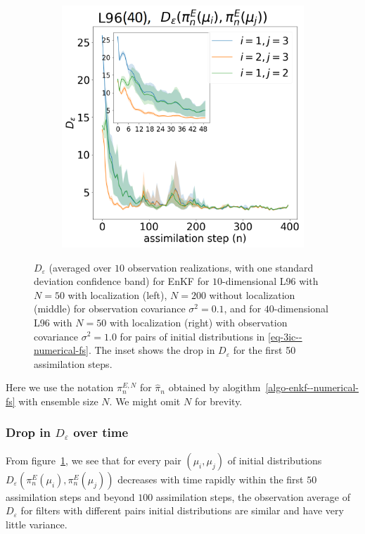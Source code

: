 \begin{figure}[!t]
\begin{subfigure}{.3\textwidth}
\end{subfigure}\hspace{0mm}%
\begin{subfigure}{.3\textwidth}
\includegraphics[width=\columnwidth]{stability/plots/figures-EnKF-stable_50_loc_L96_40dim.png}%
\end{subfigure}%
\caption{$D_\varepsilon$ (averaged over $10$ observation realizations, with one standard deviation confidence band) for EnKF for $10$-dimensional L96 with $N=50$ with localization (left), $N=200$ without localization (middle) for observation covariance $\sigma^2=0.1$, and for $40$-dimensional L96 with $N=50$ with localization (right) with observation covariance $\sigma^2=1.0$ for pairs of initial distributions in \ref{eq-3ic--numerical-fs}. The inset shows the drop in $D_\varepsilon$ for the first 50 assimilation steps.}
\label{fig:plot-enkfL96-10--numerical-fs}
\end{figure}
Here we use the notation $\pi^{E,N}_n$ for $\hat\pi_n$ obtained by alogithm~\ref{algo-enkf--numerical-fs} with ensemble size $N$. We might omit $N$ for brevity.
\subsubsection{Drop in $D_\varepsilon$ over time}
From figure~\ref{fig:plot-enkfL96-10--numerical-fs}, we see that for every pair $(\mu_i, \mu_j)$ of initial distributions $D_\varepsilon(\pi^E_n(\mu_i), \pi^E_n(\mu_j))$ decreases with time rapidly within the first $50$ assimilation steps and beyond $100$ assimilation steps, the observation average of $D_\varepsilon$ for filters with different pairs initial distributions are similar and have very little variance.
